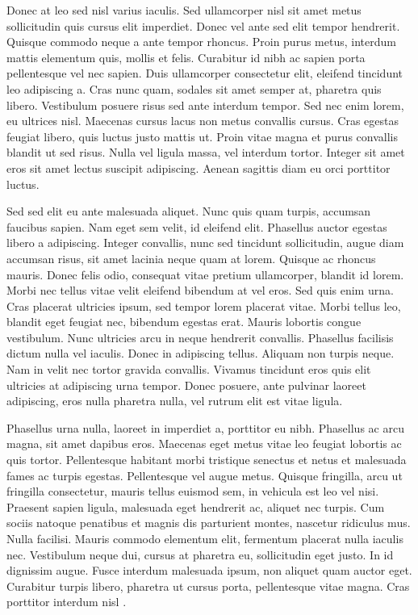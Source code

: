 \documentclass[bsc, classic, a4paper]{ufbathesis}
\begin{document}
Donec at leo sed nisl varius iaculis. Sed ullamcorper nisl sit amet metus sollicitudin quis cursus elit imperdiet. Donec vel ante sed elit tempor hendrerit. Quisque commodo neque a ante tempor rhoncus. Proin purus metus, interdum mattis elementum quis, mollis et felis. Curabitur id nibh ac sapien porta pellentesque vel nec sapien. Duis ullamcorper consectetur elit, eleifend tincidunt leo adipiscing a. Cras nunc quam, sodales sit amet semper at, pharetra quis libero. Vestibulum posuere risus sed ante interdum tempor. Sed nec enim lorem, eu ultrices nisl. Maecenas cursus lacus non metus convallis cursus. Cras egestas feugiat libero, quis luctus justo mattis ut. Proin vitae magna et purus convallis blandit ut sed risus. Nulla vel ligula massa, vel interdum tortor. Integer sit amet eros sit amet lectus suscipit adipiscing. Aenean sagittis diam eu orci porttitor luctus.

Sed sed elit eu ante malesuada aliquet. Nunc quis quam turpis, accumsan faucibus sapien. Nam eget sem velit, id eleifend elit. Phasellus auctor egestas libero a adipiscing. Integer convallis, nunc sed tincidunt sollicitudin, augue diam accumsan risus, sit amet lacinia neque quam at lorem. Quisque ac rhoncus mauris. Donec felis odio, consequat vitae pretium ullamcorper, blandit id lorem. Morbi nec tellus vitae velit eleifend bibendum at vel eros. Sed quis enim urna. Cras placerat ultricies ipsum, sed tempor lorem placerat vitae. Morbi tellus leo, blandit eget feugiat nec, bibendum egestas erat. Mauris lobortis congue vestibulum. Nunc ultricies arcu in neque hendrerit convallis. Phasellus facilisis dictum nulla vel iaculis. Donec in adipiscing tellus. Aliquam non turpis neque. Nam in velit nec tortor gravida convallis. Vivamus tincidunt eros quis elit ultricies at adipiscing urna tempor. Donec posuere, ante pulvinar laoreet adipiscing, eros nulla pharetra nulla, vel rutrum elit est vitae ligula.

Phasellus urna nulla, laoreet in imperdiet a, porttitor eu nibh. Phasellus ac arcu magna, sit amet dapibus eros. Maecenas eget metus vitae leo feugiat lobortis ac quis tortor. Pellentesque habitant morbi tristique senectus et netus et malesuada fames ac turpis egestas. Pellentesque vel augue metus. Quisque fringilla, arcu ut fringilla consectetur, mauris tellus euismod sem, in vehicula est leo vel nisi. Praesent sapien ligula, malesuada eget hendrerit ac, aliquet nec turpis. Cum sociis natoque penatibus et magnis dis parturient montes, nascetur ridiculus mus. Nulla facilisi. Mauris commodo elementum elit, fermentum placerat nulla iaculis nec. Vestibulum neque dui, cursus at pharetra eu, sollicitudin eget justo. In id dignissim augue. Fusce interdum malesuada ipsum, non aliquet quam auctor eget. Curabitur turpis libero, pharetra ut cursus porta, pellentesque vitae magna. Cras porttitor interdum nisl \cite{raymond1999}.
\end{document}
